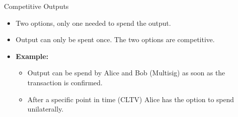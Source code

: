 \documentclass[handout]{beamer}
\begin{document}
\begin{frame}{Competitive Outputs}
\begin{minipage}{0.3\textwidth}
\begin{figure}
		\end{figure}
	\end{minipage}%
	\hfill
	\begin{minipage}{0.6\textwidth}
		\begin{itemize}
			\item<1-> Two options, only one needed to spend the output.
			\item<2-> Output can only be spent once. The two options are competitive.
			\vspace{0.25cm}
			\item<3-> \textbf{Example:}
			\begin{itemize}
				\item<3-> Output can be spend by Alice and Bob (Multisig) as soon as the transaction is confirmed.
				\item<4-> After a specific point in time (CLTV) Alice has the option to spend unilaterally.
			\end{itemize}
		\end{itemize}
	\end{minipage}
\end{frame}

\end{document}
